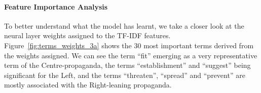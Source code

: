 
\paragraph{Feature Importance Analysis}

To better understand what the model has learnt, we take a closer look at the neural layer weights assigned to the TF-IDF features.
Figure~\ref{fig:terms_weights_3a} shows the 30 most important terms derived from the weights assigned.
We can see the term ``fit'' emerging as a very representative term of the Centre-propaganda, the terms ``establishment'' and ``suggest'' being significant for the Left, and the terms ``threaten'', ``spread'' and ``prevent'' are mostly associated with the Right-leaning propaganda.


